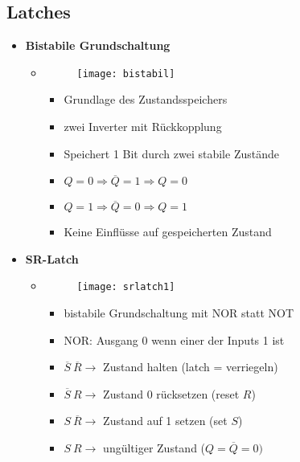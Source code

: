\subsection{Latches}
\begin{itemize}

\item \textbf{Bistabile Grundschaltung}
	\begin{itemize}
	
	
	\item[]		
				\begin{minipage}{0.25\textwidth}
					\begin{figure}[H]
					\texttt{[image: bistabil]}
					\end{figure}
				\end{minipage}
				\begin{minipage}[t]{0.6\textwidth}
					\vspace{-1.5cm}
					\begin{itemize}
					\item Grundlage des Zustandsspeichers
					\item zwei Inverter mit Rückkopplung
					\item Speichert 1 Bit durch zwei stabile Zustände
					\item $Q=0 \Rightarrow \overline{Q} =1 \Rightarrow Q=0$
					\item $Q=1 \Rightarrow \overline{Q} =0 \Rightarrow Q=1$
					\item Keine Einflüsse auf gespeicherten Zustand
					\end{itemize}
				\end{minipage}
	
	\end{itemize}
	
\item \textbf{SR-Latch}
	\begin{itemize}
	\item[]		
				\begin{minipage}{0.25\textwidth}
					\begin{figure}[H]
					\texttt{[image: srlatch1]}
					\end{figure}
				\end{minipage}
				\begin{minipage}[t]{0.6\textwidth}
					\vspace{-1.25cm}
					\begin{itemize}
					\item bistabile Grundschaltung mit NOR statt NOT
					\item NOR: Ausgang 0 wenn einer der Inputs 1 ist
					\item $\overline{S}~\overline{R} \rightarrow$ Zustand halten (latch = verriegeln)
					\item $\overline{S}~R \rightarrow$ Zustand 0 rücksetzen (reset $R$)
					\item $S~\overline{R} \rightarrow$ Zustand auf 1 setzen (set $S$)
					\item $S~R \rightarrow$ ungültiger Zustand ($Q=\overline{Q}=0)$
					\end{itemize}
				\end{minipage}
				

\end{itemize}
\end{itemize}
